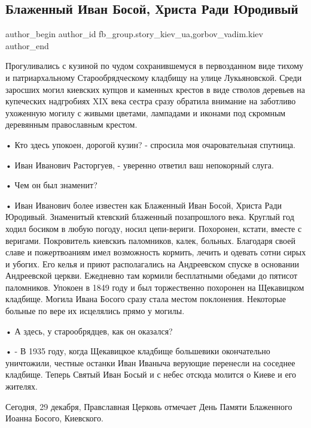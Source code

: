  
 
 
 
 
 
\subsection{Блаженный Иван Босой, Христа Ради Юродивый}
\label{sec:29_12_2021.fb.fb_group.story_kiev_ua.1.ivan_bosoj}
 
\ifcmt
 author_begin
   author_id fb_group.story_kiev_ua,gorbov_vadim.kiev
 author_end
\fi


Прогуливались  с кузиной по чудом сохранившемуся в первозданном виде тихому и
патриархальному Старообрядческому кладбищу на улице Лукьяновской. Среди
заросших могил киевских купцов и каменных крестов в виде стволов деревьев на
купеческих надгробиях  XIX века сестра сразу  обратила внимание на заботливо
ухоженную могилу с живыми цветами, лампадами и иконами под скромным деревянным
православным крестом.

• Кто здесь упокоен, дорогой кузин? - спросила моя очаровательная спутница.

• Иван Иванович Расторгуев, - уверенно ответил ваш непокорный слуга.

• Чем он был знаменит?

• Иван Иванович более известен как Блаженный Иван Босой, Христа Ради Юродивый.
Знаменитый ктевский блаженный позапрошлого века. Круглый год ходил босиком в
любую погоду, носил цепи-вериги. Похоронен, кстати,  вместе  с веригами.
Покровитель киевскиъ паломников, калек, больных. Благодаря своей славе и
пожертвоаниям имел возможность кормить, лечить и одевать сотни сирых и убогих.
Его келья и приют располагались на Андреевском спуске в основании Андреевской
церкви. Ежедневно там кормили бесплатными обедами до пятисот паломников.
Упокоен в 1849 году и был торжественно похоронен на Щекавицком кладбище. Могила
Ивана Босого сразу стала местом поклонения. Некоторые больные по вере их
исцелялись прямо у могилы.

• А здесь, у старообрядцев,  как он оказался?

• - В 1935 году, когда Щекавицкое кладбище большевики окончательно уничтожили,
честные останки  Иван Иваныча верующие перенесли на соседнее кладбище. Теперь
Святый Иван Босый и с небес отсюда молится о Киеве и его жителях.

Сегодня, 29 декабря, Правславная Церковь отмечает День Памяти Блаженного
Иоанна Босого, Киевского.

